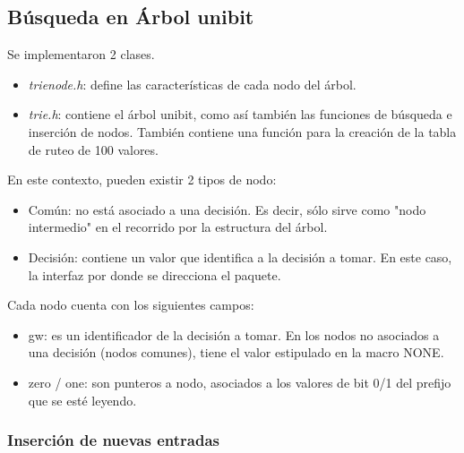 \subsection {Búsqueda en Árbol unibit}

Se implementaron 2 clases. 

\begin{itemize}
	\item \textit{trienode.h}: define las características de cada nodo del árbol.
	\item \textit{trie.h}: contiene el árbol unibit, como así también las funciones de búsqueda e inserción de nodos. También contiene una función para la creación de la tabla de ruteo de 100 valores.
\end{itemize}


En este contexto, pueden existir 2 tipos de nodo:

\begin{itemize}
	\item Común: no está asociado a una decisión. Es decir, sólo sirve como "nodo intermedio" en el recorrido por la estructura del árbol.
	\item Decisión: contiene un valor que identifica a la decisión a tomar. En este caso, la interfaz por donde se direcciona el paquete.
\end{itemize}

Cada nodo cuenta con los siguientes campos:
\begin{itemize}
	\item gw: es un identificador de la decisión a tomar. En los nodos no asociados a una decisión (nodos comunes), tiene el valor estipulado en la macro NONE.
    \item zero / one: son punteros a nodo, asociados a los valores de bit 0/1 del prefijo que se esté leyendo.

\end{itemize}

\subsubsection{Inserción de nuevas entradas}

